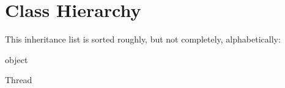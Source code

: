 \section{Class Hierarchy}
This inheritance list is sorted roughly, but not completely, alphabetically\+:\begin{DoxyCompactList}
\item object\begin{DoxyCompactList}
\item {}
\item {}
\item {}
\end{DoxyCompactList}
\item Thread\begin{DoxyCompactList}
\item {}
\end{DoxyCompactList}
\end{DoxyCompactList}
